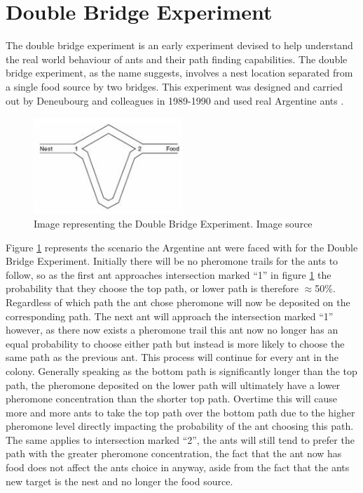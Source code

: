 \section{Double Bridge Experiment}
\label{dblbridge}
The double bridge experiment is an early experiment devised to help understand the real world behaviour of ants and their path finding capabilities. The double bridge experiment, as the name suggests, involves a nest location separated from a single food source by two bridges. This experiment was designed and carried out by Deneubourg and colleagues in 1989-1990 and used real Argentine ants \cite{marcdorgio:book:doublebridges}.

\begin{figure}[h!]
\centering
\includegraphics[width=0.5\textwidth]{Images/chapter1/doublebridge}
\caption[Double Bridge Experiment]{Image representing the Double Bridge Experiment. Image source \cite{doublebridges:image}}
\label{fig:doublebridge}
\end{figure}

\noindent
Figure \ref{fig:doublebridge} represents the scenario the Argentine ant were faced with for the Double Bridge Experiment. Initially there will be no pheromone trails for the ants to follow, so as the first ant approaches intersection marked \enquote{1} in figure \ref{fig:doublebridge} the probability that they choose the top path, or lower path is therefore $\approx$50\%. Regardless of which path the ant chose pheromone will now be deposited on the corresponding path. The next ant will approach the intersection marked \enquote{1} however, as there now exists a pheromone trail this ant now no longer has an equal probability to choose either path but instead is more likely to choose the same path as the previous ant. This process will continue for every ant in the colony. Generally speaking as the bottom path is significantly longer than the top path, the pheromone deposited on the lower path will ultimately have a lower pheromone concentration than the shorter top path. Overtime this will cause more and more ants to take the top path over the bottom path due to the higher pheromone level directly impacting the probability of the ant choosing this path. The same applies to intersection marked \enquote{2}, the ants will still tend to prefer the path with the greater pheromone concentration, the fact that the ant now has food does not affect the ants choice in anyway, aside from the fact that the ants new target is the nest and no longer the food source.

